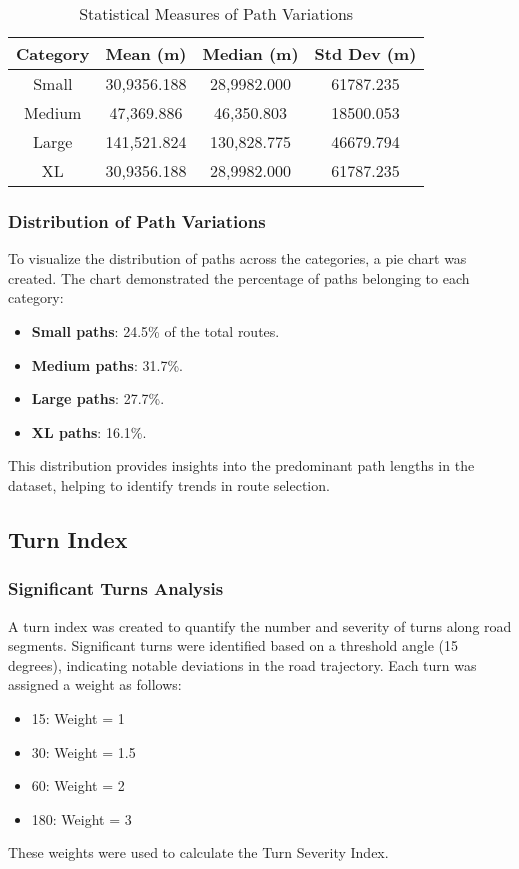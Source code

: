 \documentclass[sigplan,screen]{acmart}
\begin{document}
\begin{table}[h!]
\centering
\begin{tabular}{|c|c|c|c|}
\hline
\textbf{Category} & \textbf{Mean (m)} & \textbf{Median (m)} & \textbf{Std Dev (m)} \\
\hline
Small & 30,9356.188 & 28,9982.000 & 61787.235 \\
Medium & 47,369.886 & 46,350.803 & 18500.053 \\
Large & 141,521.824 & 130,828.775 & 46679.794 \\
XL & 30,9356.188 & 28,9982.000 & 61787.235 \\
\hline
\end{tabular}
\caption{Statistical Measures of Path Variations}
\end{table}

\subsubsection{Distribution of Path Variations}
To visualize the distribution of paths across the categories, a pie chart was created. The chart demonstrated the percentage of paths belonging to each category:
\begin{itemize}
    \item \textbf{Small paths}: 24.5\% of the total routes.
    \item \textbf{Medium paths}: 31.7\%.
    \item \textbf{Large paths}: 27.7\%.
    \item \textbf{XL paths}: 16.1\%.
\end{itemize}
This distribution provides insights into the predominant path lengths in the dataset, helping to identify trends in route selection.

\subsection{Turn Index}
\subsubsection{Significant Turns Analysis}
A turn index was created to quantify the number and severity of turns along road segments. Significant turns were identified based on a threshold angle (15 degrees), indicating notable deviations in the road trajectory. Each turn was assigned a weight as follows:
\begin{itemize}
    \item 15\degree: Weight = 1
    \item 30\degree: Weight = 1.5
    \item 60\degree: Weight = 2
    \item 180\degree: Weight = 3
\end{itemize}
These weights were used to calculate the Turn Severity Index.
\end{document}
